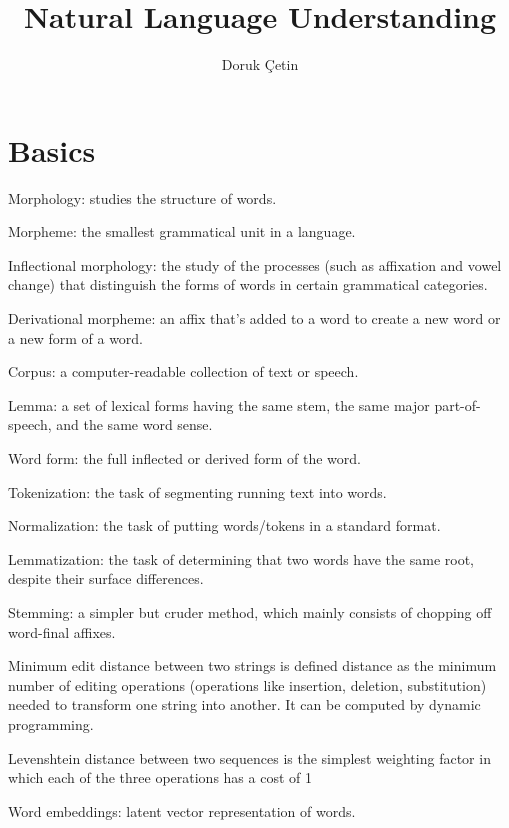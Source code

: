 \documentclass[12pt]{article}
\begin{document}
\rhead{\today}

\title{Natural Language Understanding}
\author{Doruk Çetin}
\maketitle

\tableofcontents
\pagebreak

\section{Basics}
\ulb
\item Morphology: studies the structure of words.
\item Morpheme: the smallest grammatical unit in a language.
\item Inflectional morphology: the study of the processes (such as affixation and vowel change) that distinguish the forms of words in certain grammatical categories.
\item Derivational morpheme: an affix that's added to a word to create a new word or a new form of a word.
\item Corpus: a computer-readable collection of text or speech.
\item Lemma: a set of lexical forms having the same stem, the same major part-of-speech, and the same word sense.
\item Word form: the full inflected or derived form of the word.
\item Tokenization: the task of segmenting running text into words.
\item Normalization: the task of putting words/tokens in a standard format.
\item Lemmatization: the task of determining that two words have the same root, despite their surface differences.
\item Stemming: a simpler but cruder method, which mainly consists of chopping off word-final affixes.
\item Minimum edit distance between two strings is defined distance as the minimum number of editing operations (operations like insertion, deletion, substitution) needed to transform one string into another. It can be computed by dynamic programming.
\item Levenshtein distance between two sequences is the simplest weighting factor in which each of the three operations has a cost of 1
\item Word embeddings: latent vector representation of words.
\end{document}
